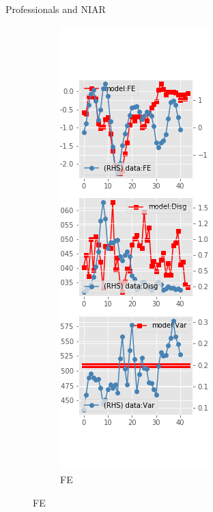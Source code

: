 \documentclass{beamer}
\begin{document}
\begin{frame}{Professionals and NIAR}
	\begin{figure}[ht]
		\label{NI_diag_SPF}
		\begin{subfigure}[b]{0.2\textwidth}
			\centering
			\caption{FE}
			\includegraphics[width=\textwidth, height = 0.8\textheight]{figuresDraft/spf_ni_est_diag0.png}

\end{subfigure}
\end{figure}
\end{frame}
\end{document}

